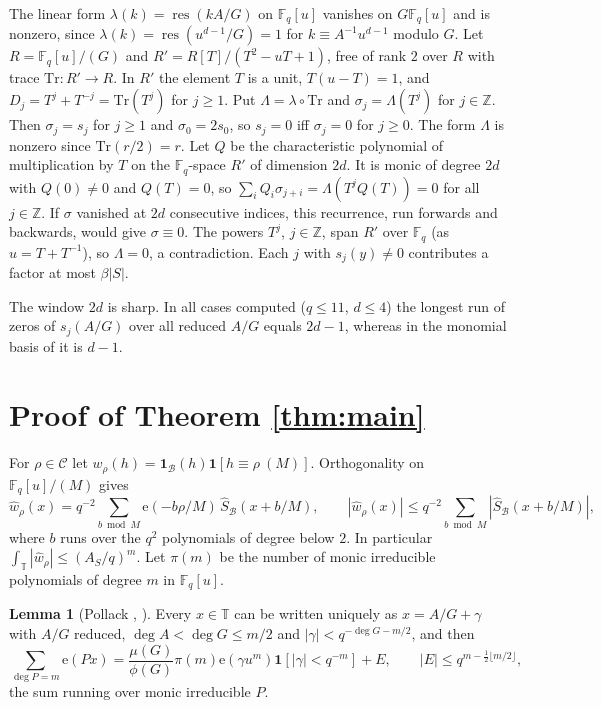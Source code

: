 \documentclass[11pt]{amsart}
\makeatletter
\theoremstyle{definition}
\newtheorem{lemma}[theorem]{Lemma}
\renewenvironment{proof}[1][\proofname]{\par\pushQED{\qed}\normalfont\topsep6\p@\@plus6\p@\relax\trivlist\item[\hskip\labelsep\upshape #1\@addpunct{.}]\ignorespaces}{\popQED\endtrivlist\@endpefalse}
\newcommand{\F}{\mathbb{F}}
\newcommand{\T}{\mathbb{T}}
\newcommand{\cB}{\mathcal{B}}
\newcommand{\cC}{\mathcal{C}}
\newcommand{\res}{\operatorname{res}}
\newcommand{\e}{\mathrm{e}}
\makeatother
\begin{document}
\begin{proof}
The linear form $\lambda(k)=\res(kA/G)$ on $\F_q[u]$ vanishes on $G\F_q[u]$ and is nonzero, since $\lambda(k)=\res(u^{d-1}/G)=1$ for $k\equiv A^{-1}u^{d-1}$ modulo $G$. Let $R=\F_q[u]/(G)$ and $R'=R[T]/(T^2-uT+1)$, free of rank $2$ over $R$ with trace $\mathrm{Tr}\colon R'\to R$. In $R'$ the element $T$ is a unit, $T(u-T)=1$, and $D_j=T^j+T^{-j}=\mathrm{Tr}(T^j)$ for $j\ge1$. Put $\Lambda=\lambda\circ\mathrm{Tr}$ and $\sigma_j=\Lambda(T^j)$ for $j\in\mathbb{Z}$. Then $\sigma_j=s_j$ for $j\ge1$ and $\sigma_0=2s_0$, so $s_j=0$ iff $\sigma_j=0$ for $j\ge0$. The form $\Lambda$ is nonzero since $\mathrm{Tr}(r/2)=r$. Let $Q$ be the characteristic polynomial of multiplication by $T$ on the $\F_q$-space $R'$ of dimension $2d$. It is monic of degree $2d$ with $Q(0)\ne0$ and $Q(T)=0$, so $\sum_iQ_i\sigma_{j+i}=\Lambda(T^jQ(T))=0$ for all $j\in\mathbb{Z}$. If $\sigma$ vanished at $2d$ consecutive indices, this recurrence, run forwards and backwards, would give $\sigma\equiv0$. The powers $T^j$, $j\in\mathbb{Z}$, span $R'$ over $\F_q$ (as $u=T+T^{-1}$), so $\Lambda=0$, a contradiction. Each $j$ with $s_j(y)\ne0$ contributes a factor at most $\beta|S|$.
\end{proof}

The window $2d$ is sharp. In all cases computed ($q\le11$, $d\le4$) the longest run of zeros of $s_j(A/G)$ over all reduced $A/G$ equals $2d-1$, whereas in the monomial basis of \cite[Lemma 3]{Porritt} it is $d-1$.

\section{Proof of Theorem \ref{thm:main}}

For $\rho\in\cC$ let $w_\rho(h)=\mathbf 1_\cB(h)\mathbf 1[h\equiv\rho\ (M)]$. Orthogonality on $\F_q[u]/(M)$ gives
\begin{equation}\label{eq:wc}
\hat w_\rho(x)=q^{-2}\sum_{b\bmod M}\e(-b\rho/M)\,\hat S_\cB(x+b/M),\qquad |\hat w_\rho(x)|\le q^{-2}\sum_{b\bmod M}|\hat S_\cB(x+b/M)|,
\end{equation}
where $b$ runs over the $q^2$ polynomials of degree below $2$. In particular $\int_\T|\hat w_\rho|\le(A_S/q)^m$. Let $\pi(m)$ be the number of monic irreducible polynomials of degree $m$ in $\F_q[u]$.

\begin{lemma}[{Pollack \cite[Lemma 5]{Pollack}, \cite[Lemma 1]{Porritt}}]\label{lem:pollack}
Every $x\in\T$ can be written uniquely as $x=A/G+\gamma$ with $A/G$ reduced, $\deg A<\deg G\le m/2$ and $|\gamma|<q^{-\deg G-m/2}$, and then
\[
\sum_{\deg P=m}\e(Px)=\frac{\mu(G)}{\phi(G)}\pi(m)\e(\gamma u^m)\mathbf 1[|\gamma|<q^{-m}]+E,\qquad|E|\le q^{m-\frac12\lfloor m/2\rfloor},
\]
the sum running over monic irreducible $P$.
\end{lemma}
\end{document}
